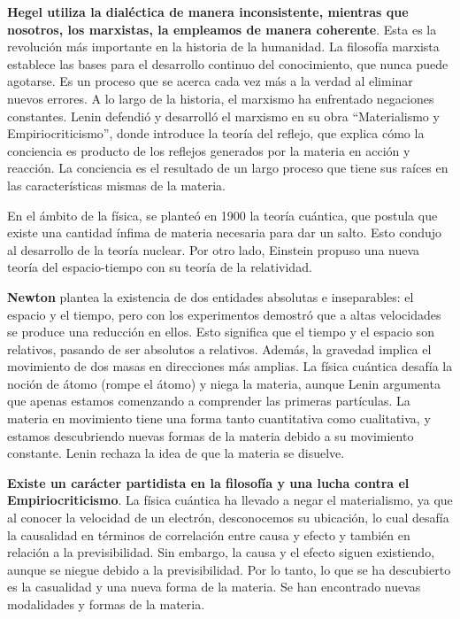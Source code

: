 \documentclass[
  a4paper,
]{article}
\begin{document}
\textbf{Hegel utiliza la dialéctica de manera inconsistente, mientras
que nosotros, los marxistas, la empleamos de manera coherente}. Esta es
la revolución más importante en la historia de la humanidad. La
filosofía marxista establece las bases para el desarrollo continuo del
conocimiento, que nunca puede agotarse. Es un proceso que se acerca cada
vez más a la verdad al eliminar nuevos errores. A lo largo de la
historia, el marxismo ha enfrentado negaciones constantes. Lenin
defendió y desarrolló el marxismo en su obra ``Materialismo y
Empiriocriticismo'', donde introduce la teoría del reflejo, que explica
cómo la conciencia es producto de los reflejos generados por la materia
en acción y reacción. La conciencia es el resultado de un largo proceso
que tiene sus raíces en las características mismas de la materia.

En el ámbito de la física, se planteó en 1900 la teoría cuántica, que
postula que existe una cantidad ínfima de materia necesaria para dar un
salto. Esto condujo al desarrollo de la teoría nuclear. Por otro lado,
Einstein propuso una nueva teoría del espacio-tiempo con su teoría de la
relatividad.

\textbf{Newton} plantea la existencia de dos entidades absolutas e
inseparables: el espacio y el tiempo, pero con los experimentos demostró
que a altas velocidades se produce una reducción en ellos. Esto
significa que el tiempo y el espacio son relativos, pasando de ser
absolutos a relativos. Además, la gravedad implica el movimiento de dos
masas en direcciones más amplias. La física cuántica desafía la noción
de átomo (rompe el átomo) y niega la materia, aunque Lenin argumenta que
apenas estamos comenzando a comprender las primeras partículas. La
materia en movimiento tiene una forma tanto cuantitativa como
cualitativa, y estamos descubriendo nuevas formas de la materia debido a
su movimiento constante. Lenin rechaza la idea de que la materia se
disuelve.

\textbf{Existe un carácter partidista en la filosofía y una lucha contra
el Empiriocriticismo}. La física cuántica ha llevado a negar el
materialismo, ya que al conocer la velocidad de un electrón,
desconocemos su ubicación, lo cual desafía la causalidad en términos de
correlación entre causa y efecto y también en relación a la
previsibilidad. Sin embargo, la causa y el efecto siguen existiendo,
aunque se niegue debido a la previsibilidad. Por lo tanto, lo que se ha
descubierto es la casualidad y una nueva forma de la materia. Se han
encontrado nuevas modalidades y formas de la materia.
\end{document}
